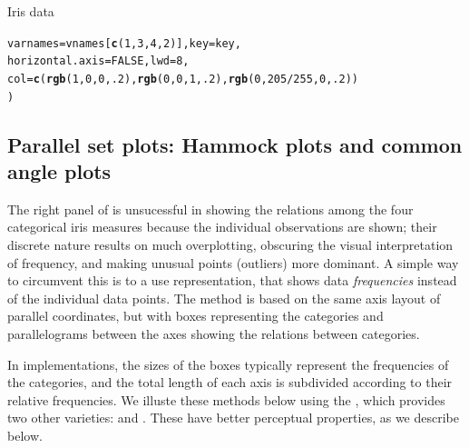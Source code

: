 \documentclass[11pt]{book}\usepackage[]{graphicx}\usepackage[]{color}
\makeatletter
\newcommand{\hlnum}[1]{\textcolor[rgb]{0.686,0.059,0.569}{#1}}%
\newcommand{\hlopt}[1]{\textcolor[rgb]{0,0,0}{#1}}%
\newcommand{\hlstd}[1]{\textcolor[rgb]{0.345,0.345,0.345}{#1}}%
\newcommand{\hlkwc}[1]{\textcolor[rgb]{0.333,0.667,0.333}{#1}}%
\newcommand{\hlkwd}[1]{\textcolor[rgb]{0.737,0.353,0.396}{\textbf{#1}}}%
\newenvironment{kframe}{%
 \def\at@end@of@kframe{}%
 \ifinner\ifhmode%
  \def\at@end@of@kframe{\end{minipage}}%
  \begin{minipage}{\columnwidth}%
 \fi\fi%
 \def\FrameCommand##1{\hskip\@totalleftmargin \hskip-\fboxsep
 \colorbox{shadecolor}{##1}\hskip-\fboxsep
     \hskip-\linewidth \hskip-\@totalleftmargin \hskip\columnwidth}%
 \MakeFramed {\advance\hsize-\width
   \@totalleftmargin\z@ \linewidth\hsize
   \@setminipage}}%
 {\par\unskip\endMakeFramed%
 \at@end@of@kframe}
\newenvironment{knitrout}{}{} %
\renewenvironment{knitrout}{\small\renewcommand{\baselinestretch}{.85}}{} %
\makeatother
\begin{document}
\begin{Example}[iris1]{Iris data}
\begin{knitrout}
\begin{kframe}
\begin{alltt}
  \hlkwc{varnames} \hlstd{= vnames[}\hlkwd{c}\hlstd{(}\hlnum{1}\hlstd{,}\hlnum{3}\hlstd{,}\hlnum{4}\hlstd{,}\hlnum{2}\hlstd{)],} \hlkwc{key}\hlstd{=key,}
  \hlkwc{horizontal.axis} \hlstd{=} \hlnum{FALSE}\hlstd{,} \hlkwc{lwd}\hlstd{=}\hlnum{8}\hlstd{,}
  \hlkwc{col}\hlstd{=}\hlkwd{c}\hlstd{(}\hlkwd{rgb}\hlstd{(}\hlnum{1}\hlstd{,}\hlnum{0}\hlstd{,}\hlnum{0}\hlstd{,}\hlnum{.2}\hlstd{),} \hlkwd{rgb}\hlstd{(}\hlnum{0}\hlstd{,}\hlnum{0}\hlstd{,}\hlnum{1}\hlstd{,}\hlnum{.2}\hlstd{),} \hlkwd{rgb}\hlstd{(}\hlnum{0}\hlstd{,}\hlnum{205}\hlopt{/}\hlnum{255}\hlstd{,}\hlnum{0}\hlstd{,}\hlnum{.2}\hlstd{) )}
  \hlstd{)}
\end{alltt}
\end{kframe}
\end{knitrout}


\end{Example}

\subsection{Parallel set plots: Hammock plots and common angle plots}

The right panel of  is unsucessful in showing the
relations among the four categorical iris measures because the individual
observations are shown; their discrete nature results on much overplotting,
obscuring the visual interpretation of frequency, and making unusual
points (outliers) more dominant.  A simple way to circumvent this is to a
use  \citep{Kosara-etal:2006} representation, that
shows data \emph{frequencies} instead of the individual data points. The
method is based on the same axis layout of parallel coordinates,
but with boxes representing the categories and parallelograms
between the axes showing the relations between categories.

In implementations, the sizes of the boxes typically represent the frequencies of
the categories, and the total length of each axis is subdivided according to
their relative frequencies. We illuste these methods below using the , which provides two other varieties: 
 \citep{Schonlau:2003} and
 \citep{HofmannVendettuoli:2013}.
These have better perceptual properties, as we describe below.
\end{document}
